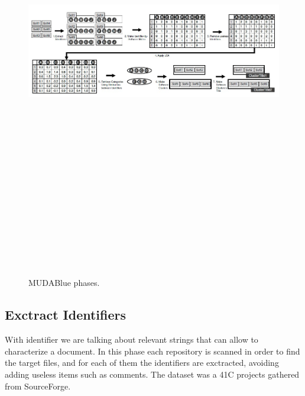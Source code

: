 \begin{figure}[!h]
\includegraphics[width=15cm,height=20cm,keepaspectratio]{images/Mudablue1.png}
\centering
\caption{MUDABlue phases.}
\end{figure}

\subsection{Exctract Identifiers}
With identifier we are talking about relevant strings that can allow to characterize a document. In this phase each repository is scanned in order to find the target files, and for each of them the identifiers are exctracted, avoiding adding useless items such as comments. The dataset was a 41C projects gathered from SourceForge.

